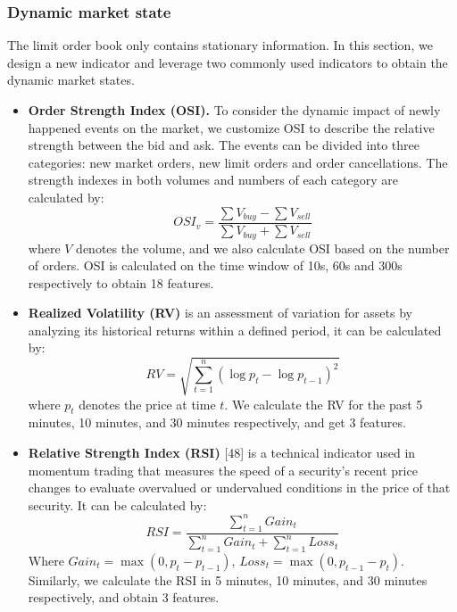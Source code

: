 \documentclass[conference]{IEEEtran}
\begin{document}
\subsubsection{Dynamic market state}
The limit order book only contains stationary information. In this section, we design a new indicator and leverage two commonly used indicators to obtain the dynamic market states.
\begin{itemize}
    \item \textbf{Order Strength Index (OSI).} To consider the dynamic impact of newly happened events on the market, we customize OSI to describe the relative strength between the bid and ask. The events can be divided into three categories: new market orders, new limit orders and order cancellations. The strength indexes in both volumes and numbers of each category are calculated by:
    \begin{equation}
    OSI_v = \frac{\sum V_{buy} - \sum V_{sell}}{\sum V_{buy} + \sum V_{sell}} \tag{2}
    \end{equation}
    where $V$ denotes the volume, and we also calculate OSI based on the number of orders. OSI is calculated on the time window of 10s, 60s and 300s respectively to obtain 18 features.
    \item \textbf{Realized Volatility (RV)} is an assessment of variation for assets by analyzing its historical returns within a defined period, it can be calculated by:
    \begin{equation}
    RV = \sqrt{\sum_{t=1}^n (\log p_t - \log p_{t-1})^2} \tag{3}
    \end{equation}
    where $p_t$ denotes the price at time $t$. We calculate the RV for the past 5 minutes, 10 minutes, and 30 minutes respectively, and get 3 features.
    \item \textbf{Relative Strength Index (RSI)} [48] is a technical indicator used in momentum trading that measures the speed of a security's recent price changes to evaluate overvalued or undervalued conditions in the price of that security. It can be calculated by:
    \begin{equation}
    RSI = \frac{\sum_{t=1}^n Gain_t}{\sum_{t=1}^n Gain_t + \sum_{t=1}^n Loss_t} \tag{4}
    \end{equation}
    Where $Gain_t = \max(0, p_t - p_{t-1})$, $Loss_t = \max(0, p_{t-1} - p_t)$. Similarly, we calculate the RSI in 5 minutes, 10 minutes, and 30 minutes respectively, and obtain 3 features.
\end{itemize}
\end{document}
